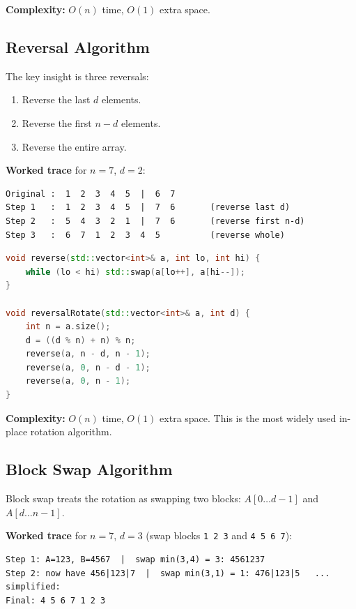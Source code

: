 \textbf{Complexity:} $O(n)$ time, $O(1)$ extra space.

\subsection{Reversal Algorithm}

The key insight is three reversals:
\begin{enumerate}
\item Reverse the last $d$ elements.
\item Reverse the first $n - d$ elements.
\item Reverse the entire array.
\end{enumerate}

\textbf{Worked trace} for $n = 7$, $d = 2$:

\begin{verbatim}
Original :  1  2  3  4  5  |  6  7
Step 1   :  1  2  3  4  5  |  7  6       (reverse last d)
Step 2   :  5  4  3  2  1  |  7  6       (reverse first n-d)
Step 3   :  6  7  1  2  3  4  5          (reverse whole)
\end{verbatim}

\begin{lstlisting}[language=C++]
void reverse(std::vector<int>& a, int lo, int hi) {
    while (lo < hi) std::swap(a[lo++], a[hi--]);
}

void reversalRotate(std::vector<int>& a, int d) {
    int n = a.size();
    d = ((d % n) + n) % n;
    reverse(a, n - d, n - 1);
    reverse(a, 0, n - d - 1);
    reverse(a, 0, n - 1);
}
\end{lstlisting}

\textbf{Complexity:} $O(n)$ time, $O(1)$ extra space. This is the most widely used in-place rotation algorithm.

\subsection{Block Swap Algorithm}

Block swap treats the rotation as swapping two blocks: $A[0 \ldots d{-}1]$ and $A[d \ldots n{-}1]$.

\textbf{Worked trace} for $n = 7$, $d = 3$ (swap blocks \texttt{1 2 3} and \texttt{4 5 6 7}):

\begin{verbatim}
Step 1: A=123, B=4567  |  swap min(3,4) = 3: 4561237
Step 2: now have 456|123|7  |  swap min(3,1) = 1: 476|123|5   ... simplified:
Final: 4 5 6 7 1 2 3
\end{verbatim}

